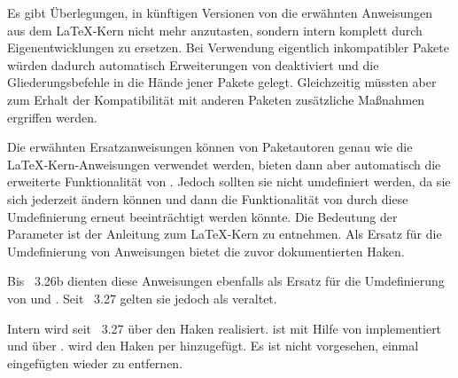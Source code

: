Es gibt Überlegungen, in künftigen Versionen von \KOMAScript{} die erwähnten
Anweisungen aus dem \LaTeX-Kern nicht mehr anzutasten, sondern intern komplett
durch Eigenentwicklungen zu ersetzen. Bei Verwendung eigentlich inkompatibler
Pakete würden dadurch automatisch Erweiterungen von \KOMAScript{} deaktiviert
und die Gliederungsbefehle in die Hände jener Pakete gelegt. Gleichzeitig
müssten aber zum Erhalt der Kompatibilität mit anderen Paketen zusätzliche
Maßnahmen ergriffen werden.

Die erwähnten Ersatzanweisungen können von Paketautoren genau wie die
\LaTeX-Kern-Anweisungen verwendet werden, bieten dann aber automatisch die
erweiterte Funktionalität von \KOMAScript{}. Jedoch sollten sie nicht
umdefiniert werden, da sie sich jederzeit ändern können und dann die
Funktionalität von \KOMAScript{} durch diese Umdefinierung erneut
beeinträchtigt werden könnte. Die Bedeutung der Parameter ist der
Anleitung zum \LaTeX-Kern \cite{latex:source2e} zu entnehmen.
Als Ersatz für die Umdefinierung von Anweisungen bietet
\KOMAScript{} die zuvor dokumentierten Haken.%
\EndIndexGroup

\begin{Explain}
  \begin{Declaration}
  \end{Declaration}
  Bis \KOMAScript{}~3.26b dienten diese Anweisungen ebenfalls
  als Ersatz für die Umdefinierung von
   und
  . Seit \KOMAScript~3.27 gelten sie jedoch als veraltet.

  Intern wird  seit \KOMAScript~3.27 über den Haken
  realisiert.  ist mit Hilfe von
   implementiert und
   über .
   wird den Haken per 
  hinzugefügt. Es ist nicht vorgesehen, einmal eingefügten  wieder
  zu entfernen.%
  \EndIndexGroup
\end{Explain}


